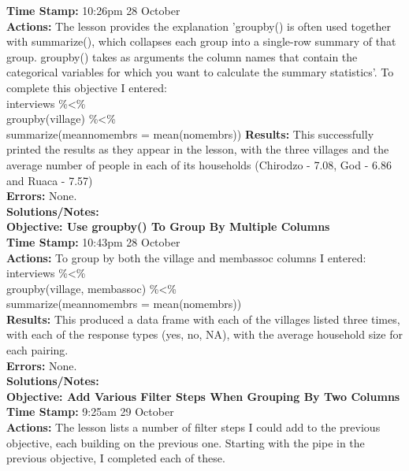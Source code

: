 \documentclass{article}
\begin{document}
\begin{FlushLeft}
\textbf{Time Stamp:} 10:26pm 28 October\\
\textbf{Actions:} The lesson provides the explanation 'group\textunderscore by() is often used together with summarize(), which collapses each group into a single-row summary of that group. group\textunderscore by() takes as arguments the column names that contain the categorical variables for which you want to calculate the summary statistics'. To complete this objective I entered:\\
interviews \%\textless\%\\
group\textunderscore by(village) \%\textless\%\\
summarize(mean\textunderscore no\textunderscore membrs = mean(no\textunderscore membrs))
\textbf{Results:} This successfully printed the results as they appear in the lesson, with the three villages and the average number of people in each of its households (Chirodzo - 7.08, God - 6.86 and Ruaca - 7.57)\\
\textbf{Errors:} None.\\
\textbf{Solutions/Notes:}\\
\vspace{5mm}
\textbf{Objective: Use group\textunderscore by() To Group By Multiple Columns}\\ 
\textbf{Time Stamp:} 10:43pm 28 October\\
\textbf{Actions:} To group by both the village and memb\textunderscore assoc columns I entered:\\
interviews \%\textless\%\\
group\textunderscore by(village, memb\textunderscore assoc) \%\textless\%\\
summarize(mean\textunderscore no\textunderscore membrs = mean(no\textunderscore membrs))\\
\textbf{Results:} This produced a data frame with each of the villages listed three times, with each of the response types (yes, no, NA), with the average household size for each pairing.\\
\textbf{Errors:} None.\\
\textbf{Solutions/Notes:}\\
\vspace{5mm}
\textbf{Objective: Add Various Filter Steps When Grouping By Two Columns}\\ 
\textbf{Time Stamp:} 9:25am 29 October\\
\textbf{Actions:} The lesson lists a number of filter steps I could add to the previous objective, each building on the previous one. Starting with the pipe in the previous objective, I completed each of these.

\end{FlushLeft}
\end{document}
